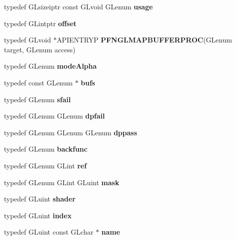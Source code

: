 \begin{DoxyCompactItemize}
\item 
typedef G\+Lsizeiptr const G\+Lvoid G\+Lenum {\bfseries usage}\label{_s_d_l__opengl_8h_aae276f20e85f16470de5a0a71eb25bc2}

\item 
typedef G\+Lintptr {\bfseries offset}\label{_s_d_l__opengl_8h_aa782f3aea23e3c30029c811241dc2c82}

\item 
typedef G\+Lvoid $\ast$A\+P\+I\+E\+N\+T\+R\+Y\+P {\bfseries P\+F\+N\+G\+L\+M\+A\+P\+B\+U\+F\+F\+E\+R\+P\+R\+O\+C}(G\+Lenum target, G\+Lenum access)\label{_s_d_l__opengl_8h_a84fb210ad9a61812a2cc667169dc4fdf}

\item 
typedef G\+Lenum {\bfseries mode\+Alpha}\label{_s_d_l__opengl_8h_a08966b5acb82a4208c175a6fbb064430}

\item 
typedef const G\+Lenum $\ast$ {\bfseries bufs}\label{_s_d_l__opengl_8h_a9250a0c49b6ffdfaa7eb9fc4f50cc8e4}

\item 
typedef G\+Lenum {\bfseries sfail}\label{_s_d_l__opengl_8h_a6114b7cdfde5ff0225f7f47480d099c6}

\item 
typedef G\+Lenum G\+Lenum {\bfseries dpfail}\label{_s_d_l__opengl_8h_afb5ba0587287e9f41ad8ba8ba3813267}

\item 
typedef G\+Lenum G\+Lenum G\+Lenum {\bfseries dppass}\label{_s_d_l__opengl_8h_ac34ccc579f21686a5802750e270e8326}

\item 
typedef G\+Lenum {\bfseries backfunc}\label{_s_d_l__opengl_8h_a80bd5ace26a420c494f2b21d0421c5e2}

\item 
typedef G\+Lenum G\+Lint {\bfseries ref}\label{_s_d_l__opengl_8h_a083de4c8e32ad3d9059245f26be721de}

\item 
typedef G\+Lenum G\+Lint G\+Luint {\bfseries mask}\label{_s_d_l__opengl_8h_a5612bf87afe1aa200ad412866de45c1f}

\item 
typedef G\+Luint {\bfseries shader}\label{_s_d_l__opengl_8h_a57b2a96adb1d51204909a82d861e395e}

\item 
typedef G\+Luint {\bfseries index}\label{_s_d_l__opengl_8h_a57f14e05b1900f16a2da82ade47d0c6d}

\item 
typedef G\+Luint const G\+Lchar $\ast$ {\bfseries name}\label{_s_d_l__opengl_8h_af7477b8725fcf509c9623f64b9d09164}


\end{DoxyCompactItemize}
